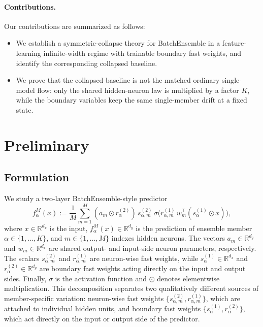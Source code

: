 \documentclass{article}
\newcommand{\R}{\mathbb{R}}
\begin{document}
\paragraph{Contributions.}
Our contributions are summarized as follows:
\begin{itemize}
\item We establish a symmetric-collapse theory for BatchEnsemble in a feature-learning infinite-width regime with trainable boundary fast weights, and identify the corresponding collapsed baseline.
\item We prove that the collapsed baseline is not the matched ordinary single-model flow: only the shared hidden-neuron law is multiplied by a factor $K$, while the boundary variables keep the same single-member drift at a fixed state.
\end{itemize}


\section{Preliminary}

\subsection{Formulation}

We study a two-layer BatchEnsemble-style predictor
\begin{equation}
f^M_\alpha(x)
:=
\frac{1}{M}
\sum_{m=1}^M
(a_m\odot r_\alpha^{(2)})\,s^{(2)}_{\alpha,m}\,
\sigma\!\bigl(r^{(1)}_{\alpha,m}\, w_m^\top(s^{(1)}_\alpha\odot x)\bigr),
\label{eq:full-predictor}
\end{equation}
where $x\in\R^{d_x}$ is the input, $f^M_\alpha(x)\in\R^{d_y}$ is the prediction of ensemble member $\alpha\in\{1,\dots,K\}$, and $m\in\{1,\dots,M\}$ indexes hidden neurons. The vectors $a_m\in\R^{d_y}$ and $w_m\in\R^{d_x}$ are shared output- and input-side neuron parameters, respectively. The scalars $s^{(2)}_{\alpha,m}$ and $r^{(1)}_{\alpha,m}$ are neuron-wise fast weights, while $s^{(1)}_\alpha\in\R^{d_x}$ and $r^{(2)}_\alpha\in\R^{d_y}$ are boundary fast weights acting directly on the input and output sides. Finally, $\sigma$ is the activation function and $\odot$ denotes elementwise multiplication. This decomposition separates two qualitatively different sources of member-specific variation: neuron-wise fast weights $\{s^{(2)}_{\alpha,m},r^{(1)}_{\alpha,m}\}$, which are attached to individual hidden units, and boundary fast weights $\{s^{(1)}_\alpha,r^{(2)}_\alpha\}$, which act directly on the input or output side of the predictor.
\end{document}
